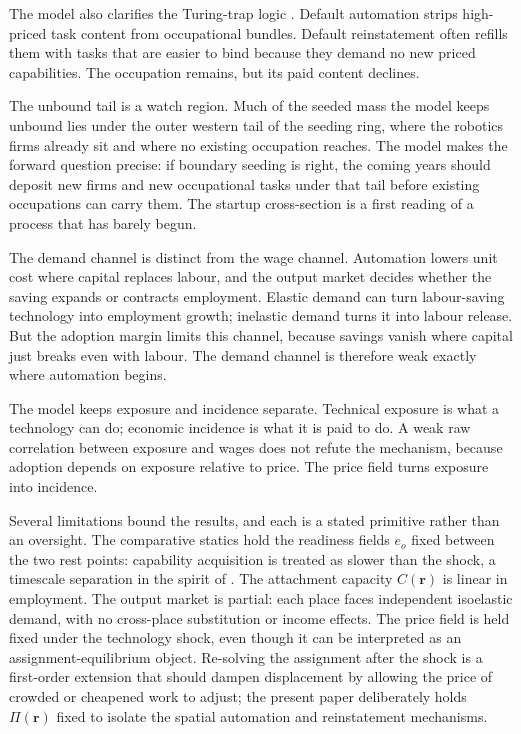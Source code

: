 \documentclass[12pt, a4paper]{article}
\begin{document}
The model also clarifies the Turing-trap logic \parencite{brynjolfsson2022turing}. Default automation strips
high-priced task content from occupational bundles. Default
reinstatement often refills them with tasks that are easier to bind
because they demand no new priced capabilities. The occupation remains,
but its paid content declines.

The unbound tail is a watch region. Much of the seeded mass the model
keeps unbound lies under the outer western tail of the seeding ring,
where the robotics firms already sit and where no existing occupation
reaches. The model makes the forward question precise: if boundary
seeding is right, the coming years should deposit new firms and new
occupational tasks under that tail before existing occupations can
carry them. The startup cross-section is a first reading of a process
that has barely begun.

The demand channel is distinct from the wage channel. Automation lowers
unit cost where capital replaces labour, and the output market decides
whether the saving expands or contracts employment. Elastic demand can
turn labour-saving technology into employment growth; inelastic demand
turns it into labour release. But the adoption margin limits this
channel, because savings vanish where capital just breaks even with
labour. The demand channel is therefore weak exactly where automation
begins.

The model keeps exposure and incidence separate. Technical exposure is
what a technology can do; economic incidence is what it is paid to do.
A weak raw correlation between exposure and wages does not refute the
mechanism, because adoption depends on exposure relative to price. The
price field turns exposure into incidence.

Several limitations bound the results, and each is a stated primitive
rather than an oversight. The comparative statics hold the readiness
fields $e_o$ fixed between the two rest points: capability acquisition
is treated as slower than the shock, a timescale separation in the
spirit of \textcite{adao2024fast}. The attachment capacity
$C(\mathbf{r})$ is linear in employment. The output market is partial:
each place faces independent isoelastic demand, with no cross-place
substitution or income effects. The price field is held fixed under
the technology shock, even though it can be interpreted as an
assignment-equilibrium object. Re-solving the assignment after the
shock is a first-order extension that should dampen displacement by
allowing the price of crowded or cheapened work to adjust; the present
paper deliberately holds $\Pi(\mathbf{r})$ fixed to isolate the spatial
automation and reinstatement mechanisms.
\end{document}
